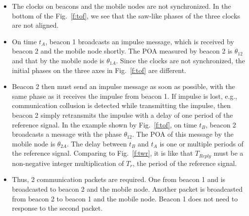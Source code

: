 \begin{itemize}
\item   The clocks on beacons and the mobile nodes are not synchronized. In the bottom of the Fig.~\ref{f:tof}, we see that the saw-like phases of the three clocks are not aligned.
\item   On time $t_A$, beacon 1 broadcasts an impulse message, which is received by beacon 2 and the mobile node shortly. The POA measured by beacon 2 is $\theta_{12}$ and that by the mobile node is $\theta_{1A}$. Since the clocks are not synchronized, the initial phases on the three axes in Fig.~\ref{f:tof} are different.
\item   Beacon 2 then must send an impulse message as soon as possible, with the same phase as it receives the impulse from beacon 1. If impulse is lost, e.g., communication collusion is detected while transmitting the impulse, then beacon 2 simply retransmits the impulse with a delay of one period of the reference signal. In the example shown by Fig.~\ref{f:tof}, on time $t_B$, beacon 2 broadcasts a message with the phase $\theta_{12}$. The POA of this message by the mobile node is $\theta_{2A}$. The delay between $t_B$ and $t_A$ is one or multiple periods of the reference signal. Comparing to Fig.~\ref{f:twr}, it is like that $T_{Reply}$ must be a non-negative integer multiplication of $T_r$, the period of the reference signal.
\item   Thus, 2 communication packets are required. One from beacon 1 and is broadcasted to beacon 2 and the mobile node. Another packet is broadcasted from beacon 2 to beacon 1 and the mobile node. Beacon 1 does not need to response to the second packet.
\end{itemize}




